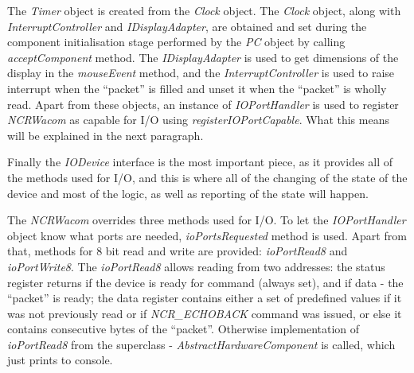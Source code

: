 The \emph{Timer} object is created from the \emph{Clock} object. The
\emph{Clock} object, along with \emph{InterruptController} and
\emph{IDisplayAdapter}, are obtained and set during the component initialisation
stage performed by the \emph{PC} object by calling \emph{acceptComponent}
method. The \emph{IDisplayAdapter} is used to get dimensions of the display in
the \emph{mouseEvent} method, and the \emph{InterruptController} is used to
raise interrupt when the ``packet'' is filled and unset it when the ``packet''
is wholly read. Apart from these objects, an instance of \emph{IOPortHandler} is
used to register \emph{NCRWacom} as capable for I/O using
\emph{registerIOPortCapable}. What this means will be explained in the next
paragraph.

Finally the \emph{IODevice} interface is the most important piece, as it
provides all of the methods used for I/O, and this is where all of the changing
of the state of the device and most of the logic, as well as reporting of the
state will happen.

\begin{codeblock}
    
\end{codeblock}

%
%
%
%
%
%
%

The \emph{NCRWacom} overrides three methods used for I/O. To let the
\emph{IOPortHandler} object know what ports are needed, \emph{ioPortsRequested}
method is used. Apart from that, methods for 8 bit read and write are provided:
\emph{ioPortRead8} and \emph{ioPortWrite8}. The \emph{ioPortRead8} allows
reading from two addresses: the status register returns if the device is ready
for command (always set), and if data - the ``packet'' is ready; the data
register contains either a set of predefined values if it was not previously
read or if \emph{NCR\_ECHOBACK} command was issued, or else it contains
consecutive bytes of the ``packet''. Otherwise implementation of
\emph{ioPortRead8} from the superclass - \emph{AbstractHardwareComponent} is
called, which just prints to console.

